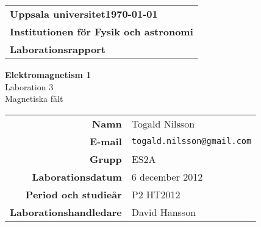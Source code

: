 \documentclass[a4paper,10pt]{article}
\makeatletter
\def\typeofdoc{Laborationsrapport}
\def\email{togald.nilsson@gmail.com}
\def\name{Togald Nilsson}
\def\university{Uppsala universitet}
\def\inst{Fysik och astronomi}
\def\course{Elektromagnetism 1}
\def\title{Laboration 3\\Magnetiska fält}
\def\group{ES2A}
\def\labdate{6 december 2012}
\def\semester{P2 HT2012}
\def\partner{Martin Roth}
\def\mentor{David Hansson}
\makeatother
\begin{document}
\begin{titlepage}
	\thispagestyle{empty}
	\begin{large}
		\begin{tabular}{@{}p{\textwidth}@{}}
			\textbf{\university \hfill \today} \\
			\textbf{Institutionen för \inst} \\
			\textbf{\typeofdoc} \\
		\end{tabular}
	\end{large}
	\vspace{10mm}
	\begin{center}
		\huge{\textbf{\course}}\\
		\vspace{10mm}
		\LARGE{\title} \\
		\vspace{15mm}
		\begin{large}
			\begin{tabular}{rl}
				\textbf{Namn} & \name \\[3mm]
				\textbf{E-mail} & {\tt \email} \\[3mm]
				\textbf{Grupp} & \group \\[3mm]
				\textbf{Laborationsdatum} & \labdate \\[3mm]
				\textbf{Period och studieår} & \semester \\[3mm]
				\textbf{Laborationshandledare} & \mentor \\[3mm]
				

\end{tabular}
\end{large}
\end{center}
\end{titlepage}
\end{document}
